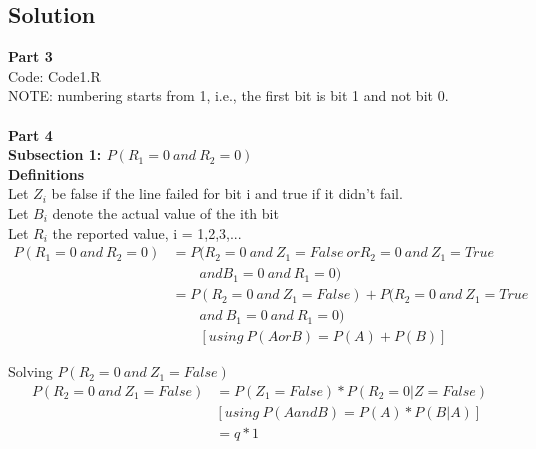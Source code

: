 \documentclass[12pt]{article}
\begin{document}
\subsection*{Solution}
\textbf{Part 3}\\
Code: Code1.R\\
NOTE: numbering starts from 1, i.e., the first bit is bit 1 and not bit 0.\\\\
\textbf{Part 4 }\\
\textbf{Subsection 1: $P(R_1 = 0\ and\ R_2 = 0)$ }\\
\textbf{Definitions}\\
Let $Z_i$ be false if the line failed for bit i and true if it didn't fail.\\
Let $B_i$ denote the actual value of the ith bit \\
Let  $R_i$ the reported value, i = 1,2,3,...
\begin{align}
P(R_1 = 0\ and\ R_2 = 0)  & = P(R_2 = 0\ and\ Z_1 = False\ or R_2 = 0\ and\ Z_1 = True \nonumber \\
 & \qquad and  B_1 = 0\ and\ R_1 = 0)\ \nonumber \\
 & = P(R_2 = 0\ and\ Z_1 = False) + P(R_2 = 0\ and\ Z_1 = True\ \nonumber \\
 & \qquad and\  B_1 = 0\ and\ R_1 = 0)\ \nonumber \\
 & \qquad [using\ P(A or B) = P(A) + P(B)]\ \nonumber
\end{align}

Solving $ P(R_2 = 0\ and\ Z_1 = False)$
\begin{align}
P(R_2 = 0\ and\ Z_1 = False)  & = P(Z_1 = False) * P(R_2 = 0 | Z = False) \nonumber \\
& [using\ P(A and B) = P(A) * P(B|A)]\ \nonumber \\
& = q * 1 \nonumber
\end{align}
\end{document}
